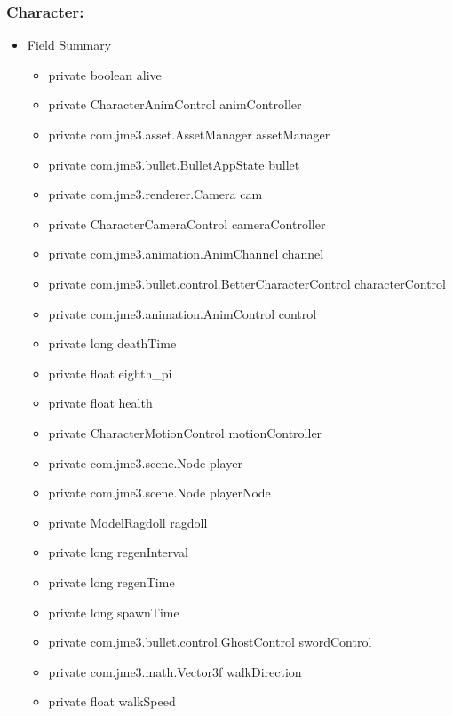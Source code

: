 \documentclass[letterpaper]{article}
\begin{document}
						\vspace{0.2in}
						\subsubsection*{Character:}
						\vspace{0.1in}
							\begin{itemize}
								\item	Field Summary
										\begin{itemize}
											\item	private boolean	alive 
											\item	private CharacterAnimControl	animController 
											\item	private com.jme3.asset.AssetManager	assetManager 
											\item	private com.jme3.bullet.BulletAppState	bullet 
											\item	private com.jme3.renderer.Camera	cam 
											\item	private CharacterCameraControl	cameraController 
											\item	private com.jme3.animation.AnimChannel	channel 
											\item	private com.jme3.bullet.control.BetterCharacterControl	characterControl 
											\item	private com.jme3.animation.AnimControl	control 
											\item	private long	deathTime 
											\item	private float	eighth\_pi 
											\item	private float	health 
											\item	private CharacterMotionControl	motionController 
											\item	private com.jme3.scene.Node	player 
											\item	private com.jme3.scene.Node	playerNode 
											\item	private ModelRagdoll	ragdoll 
											\item	private long	regenInterval 
											\item	private long	regenTime 
											\item	private long	spawnTime 
											\item	private com.jme3.bullet.control.GhostControl	swordControl 
											\item	private com.jme3.math.Vector3f	walkDirection 
											\item	private float	walkSpeed 

\end{itemize}
\end{itemize}
\end{document}
